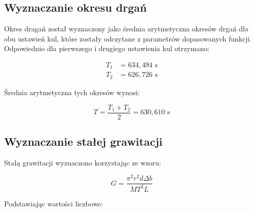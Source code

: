 \documentclass[a4paper,12pt]{article}
\begin{document}


\subsection{Wyznaczanie okresu drgań}

Okres dragań został wyznaczony jako średnia arytmetyczna okresów drgań dla obu ustawień kul, które zostały odczytane z parametrów dopasowanych funkcji. Odpowiednio dla pierwszego i drugiego ustawienia kul otrzymano:

\begin{align*}
    T_1 & = 634{,}494 \text{ s} \\
    T_2 & = 626{,}726 \text{ s}
\end{align*}

Średnia arytmetyczna tych okresów wynosi:

$$
    T = \frac{T_1 + T_2}{2} = 630{,}610 \text{ s}
$$





\subsection{Wyznaczanie stałej grawitacji}

Stałą grawitacji wyznaczono korzystając ze wzoru:

\begin{equation*}
    G = \frac{\pi^2 r^2 d \Delta b}{MT^2L}
\end{equation*}

Podstawiając wartości liczbowe:
\end{document}
